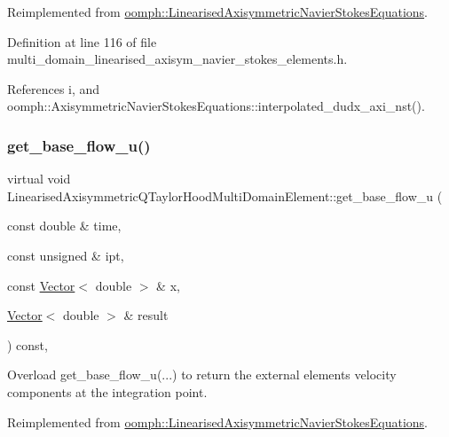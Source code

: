 Reimplemented from \hyperlink{classoomph_1_1LinearisedAxisymmetricNavierStokesEquations_aa3924125dde70779c180b84408271422}{oomph\+::\+Linearised\+Axisymmetric\+Navier\+Stokes\+Equations}.



Definition at line 116 of file multi\+\_\+domain\+\_\+linearised\+\_\+axisym\+\_\+navier\+\_\+stokes\+\_\+elements.\+h.



References i, and oomph\+::\+Axisymmetric\+Navier\+Stokes\+Equations\+::interpolated\+\_\+dudx\+\_\+axi\+\_\+nst().

\mbox{\label{classLinearisedAxisymmetricQTaylorHoodMultiDomainElement_a4e583d2145c56f10d26fdc8527128b54}} 
\subsubsection{\texorpdfstring{get\+\_\+base\+\_\+flow\+\_\+u()}{get\_base\_flow\_u()}}
{\footnotesize\ttfamily virtual void Linearised\+Axisymmetric\+Q\+Taylor\+Hood\+Multi\+Domain\+Element\+::get\+\_\+base\+\_\+flow\+\_\+u (\begin{DoxyParamCaption}\item[{const double \&}]{time,  }\item[{const unsigned \&}]{ipt,  }\item[{const \hyperlink{classoomph_1_1Vector}{Vector}$<$ double $>$ \&}]{x,  }\item[{\hyperlink{classoomph_1_1Vector}{Vector}$<$ double $>$ \&}]{result }\end{DoxyParamCaption}) const\hspace{0.3cm}{\ttfamily [inline]}, {\ttfamily [virtual]}}



Overload get\+\_\+base\+\_\+flow\+\_\+u(...) to return the external element\textquotesingle{}s velocity components at the integration point. 



Reimplemented from \hyperlink{classoomph_1_1LinearisedAxisymmetricNavierStokesEquations_a74c8399c96e4870f831dcc01986a72cd}{oomph\+::\+Linearised\+Axisymmetric\+Navier\+Stokes\+Equations}.



